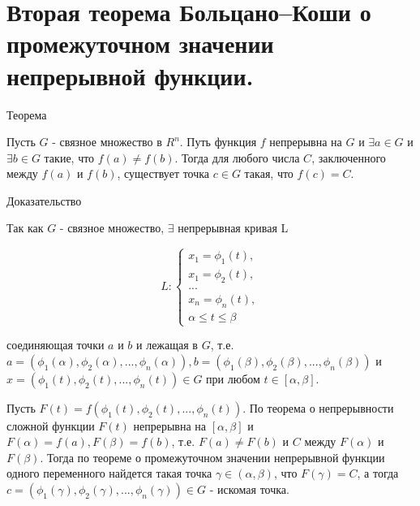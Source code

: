 \section{Вторая теорема Больцано–Коши о промежуточном значении непрерывной функции.}
    
Теорема
    
Пусть $G$ - связное множество в $R^n$. Путь функция $f$ непрерывна на $G$ и $\exists a \in G$ и $\exists b \in G$ такие, что $f(a) \not= f(b)$. Тогда для любого числа $C$, заключенного между $f(a)$ и $f(b)$, существует точка $c \in G$ такая, что $f(c) = C$.
    
Доказательство
    
Так как $G$ - связное множество, $\exists$ непрерывная кривая L
    
\begin{displaymath}
    L: 
    \begin{cases} 
        x_1 = \phi_1(t), \\ 
        x_1 = \phi_2(t), \\
        ... \\
        x_n = \phi_n(t), \\
        \alpha \leq t \leq \beta
    \end{cases}
\end{displaymath}
    
соединяющая точки $a$ и $b$ и лежащая в $G$, т.е. $a = (\phi_1(\alpha), \phi_2(\alpha), ..., \phi_n(\alpha)), b = (\phi_1(\beta), \phi_2(\beta), ..., \phi_n(\beta))$ и $x = (\phi_1(t), \phi_2(t), ..., \phi_n(t)) \in G$ при любом $t\in [\alpha, \beta]$. 
    
Пусть $F(t) = f(\phi_1(t), \phi_2(t), ..., \phi_n(t))$. По теорема о непрерывности сложной функции $F(t)$ непрерывна на $[\alpha, \beta]$ и $F(\alpha) = f(a), F(\beta) = f(b)$, т.е. $F(a) \not= F(b)$ и $C$ между $F(\alpha)$ и $F(\beta)$. Тогда по теореме о промежуточном значении непрерывной функции одного переменного найдется такая точка $\gamma \in (\alpha, \beta)$, что $F(\gamma) = C$, а тогда $c = (\phi_1(\gamma), \phi_2(\gamma), ..., \phi_n(\gamma)) \in G$ - искомая точка.